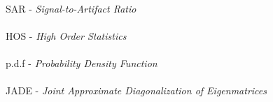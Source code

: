 \paragraph{}SAR  - \textit{Signal-to-Artifact Ratio}
\paragraph{}HOS  - \textit{High Order Statistics}
\paragraph{}p.d.f  - \textit{Probability Density Function}
\paragraph{}JADE  - \textit{Joint Approximate Diagonalization of Eigenmatrices}
\pagebreak







